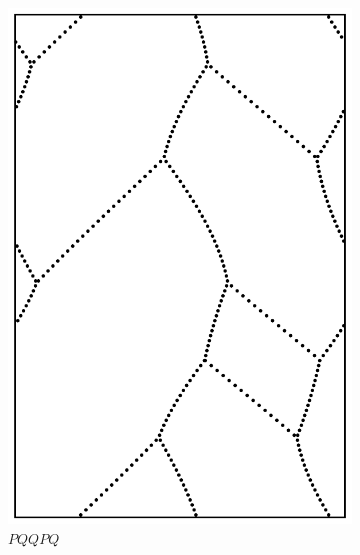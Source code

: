 \documentclass[12pt,twoside]{reedthesis}
\theoremstyle{definition}
\begin{document}
\begin{figure}[h]
\begin{subfigure}[t]{0.24\textwidth}
    \includegraphics[width=\textwidth]{figures/string_cheese_appendix/pqqpq.pdf}
    \caption*{$PQQPQ$}
    \vspace{5mm}
  \end{subfigure}
  \hfill
  \begin{subfigure}[t]{0.24\textwidth}

\end{subfigure}
\end{figure}
\end{document}
